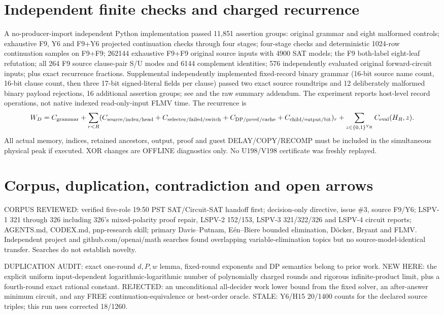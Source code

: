 \documentclass[11pt]{article}
\begin{document}
\section{Independent finite checks and charged recurrence}
A no-producer-import independent Python implementation passed 11,851 assertion groups: original grammar and eight malformed controls; exhaustive F9, Y6 and F9+Y6 projected continuation checks through four stages; four-stage checks and deterministic 1024-row continuation samples on F9+F9; 262144 exhaustive F9+F9 original source inputs with 4900 SAT models; the F9 both-label eight-leaf refutation; all 264 F9 source clause-pair S/U modes and 6144 complement identities; 576 independently evaluated original forward-circuit inputs; plus exact recurrence fractions.
Supplemental independently implemented fixed-record binary grammar (16-bit source name count, 16-bit clause count, then three 17-bit signed-literal fields per clause) passed two exact source roundtrips and 12 deliberately malformed binary payload rejections, 16 additional assertion groups; see  and the raw summary addendum. The experiment reports host-level record operations, not native indexed read-only-input FLMV time. The recurrence is
\[
W_D=C_{\rm grammar}+\sum_{r<R}(C_{\rm source/index/head}+C_{\rm selector/failed/switch}
+C_{\rm DP/proof/cache}+C_{\rm child/output/bit})_r
+\sum_{z\in\{0,1\}^{V_R}}C_{\rm eval}(H_R,z).
\]
All actual memory, indices, retained ancestors, output, proof and guest DELAY/COPY/RECOMP must be included in the simultaneous physical peak if executed. XOR changes are OFFLINE diagnostics only. No U198/V198 certificate was freshly replayed.

\section{Corpus, duplication, contradiction and open arrows}
CORPUS REVIEWED: verified five-role 19:50 PST SAT/Circuit-SAT handoff first; decision-only directive, issue \#3, source F9/Y6; LSPV-1 321 through 326 including 326's mixed-polarity proof repair, LSPV-2 152/153, LSPV-3 321/322/326 and LSPV-4 circuit reports; AGENTS.md, CODEX.md, pnp-research skill; primary Davis--Putnam, E\'en--Biere bounded elimination, D\"ocker, Bryant and FLMV. Independent project and github.com/openai/math searches found overlapping variable-elimination topics but no source-model-identical transfer. Searches do not establish novelty.

DUPLICATION AUDIT: exact one-round $d,P,w$ lemma, fixed-round exponents and DP semantics belong to prior work. NEW HERE: the explicit uniform input-dependent logarithmic-logarithmic number of polynomially charged rounds and rigorous infinite-product limit, plus a fourth-round exact rational constant. REJECTED: an unconditional all-decider work lower bound from the fixed solver, an after-answer minimum circuit, and any FREE continuation-equivalence or best-order oracle. STALE: Y6/H15 20/1400 counts for the declared source triples; this run uses corrected 18/1260.
\end{document}
